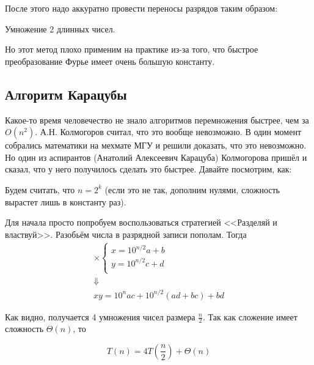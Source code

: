 \documentclass[a4paper, 12pt]{article}
\begin{document}
После этого надо аккуратно провести переносы разрядов таким образом:

\begin{algorithm}
  \caption{Умножение 2 длинных чисел.}
  \begin{algorithmic}[1]
     
      \EndFor
    \EndFunction
  \end{algorithmic}
\end{algorithm}

Но этот метод плохо применим на практике из-за того, что быстрое преобразование
Фурье имеет очень большую константу.

\subsection{Алгоритм Карацубы}

Какое-то время человечество не знало алгоритмов перемножения быстрее, чем за
$O(n^2)$. А.Н. Колмогоров считал, что это вообще невозможно. В один момент
собрались математики на мехмате МГУ и решили доказать, что это невозможно. Но
один из аспирантов (Анатолий Алексеевич Карацуба) Колмогорова пришёл и сказал, что у него получилось сделать
это быстрее. Давайте посмотрим, как:

Будем считать, что $n = 2^k$ (если это не так, дополним нулями, сложность вырастет лишь в константу раз).

Для начала просто попробуем воспользоваться стратегией <<Разделяй и властвуй>>. Разобьём числа в 
разрядной записи пополам. Тогда
\[\begin{array}{c}
\times \begin{cases}
x = 10^{n/2}a + b\\
y = 10^{n/2}c + d\\
\end{cases} \\
\Downarrow\\
xy = 10^{n}ac + 10^{n/2}(ad+bc)+bd
\end{array}\]

Как видно, получается 4 умножения чисел размера $\frac{n}{2}$. Так как сложение имеет сложность $\Theta(n)$, то

\[T(n) = 4T\left( \frac{n}{2} \right) + \Theta(n)\]
\end{document}
